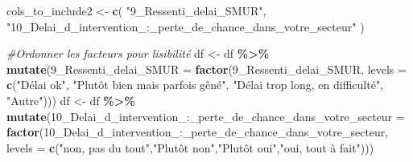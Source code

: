 \documentclass[
]{article}
\newenvironment{Shaded}{\begin{snugshade}}{\end{snugshade}}
\newcommand{\AttributeTok}[1]{\textcolor[rgb]{0.13,0.29,0.53}{#1}}
\newcommand{\CommentTok}[1]{\textcolor[rgb]{0.56,0.35,0.01}{\textit{#1}}}
\newcommand{\FunctionTok}[1]{\textcolor[rgb]{0.13,0.29,0.53}{\textbf{#1}}}
\newcommand{\NormalTok}[1]{#1}
\newcommand{\OtherTok}[1]{\textcolor[rgb]{0.56,0.35,0.01}{#1}}
\newcommand{\SpecialCharTok}[1]{\textcolor[rgb]{0.81,0.36,0.00}{\textbf{#1}}}
\newcommand{\StringTok}[1]{\textcolor[rgb]{0.31,0.60,0.02}{#1}}
\begin{document}
\begin{Shaded}
\begin{Highlighting}[]
\NormalTok{cols\_to\_include2 }\OtherTok{\textless{}{-}} \FunctionTok{c}\NormalTok{(}
  \StringTok{"9\_Ressenti\_delai\_SMUR"}\NormalTok{,}
  \StringTok{"10\_Delai\_d\_intervention\_:\_perte\_de\_chance\_dans\_votre\_secteur"}
\NormalTok{)}
    
\CommentTok{\#Ordonner les facteurs pour lisibilité}
\NormalTok{df }\OtherTok{\textless{}{-}}\NormalTok{ df }\SpecialCharTok{\%\textgreater{}\%}
  \FunctionTok{mutate}\NormalTok{(}\StringTok{\textasciigrave{}}\AttributeTok{9\_Ressenti\_delai\_SMUR}\StringTok{\textasciigrave{}} \OtherTok{=} \FunctionTok{factor}\NormalTok{(}\StringTok{\textasciigrave{}}\AttributeTok{9\_Ressenti\_delai\_SMUR}\StringTok{\textasciigrave{}}\NormalTok{,}
                                          \AttributeTok{levels =} \FunctionTok{c}\NormalTok{(}\StringTok{"Délai ok"}\NormalTok{,}
                                                     \StringTok{"Plutôt bien mais parfois gêné"}\NormalTok{,}
                                                     \StringTok{"Délai trop long, en difficulté"}\NormalTok{,}
                                                     \StringTok{"Autre"}\NormalTok{)))}
\NormalTok{df }\OtherTok{\textless{}{-}}\NormalTok{ df }\SpecialCharTok{\%\textgreater{}\%}
  \FunctionTok{mutate}\NormalTok{(}\StringTok{\textasciigrave{}}\AttributeTok{10\_Delai\_d\_intervention\_:\_perte\_de\_chance\_dans\_votre\_secteur}\StringTok{\textasciigrave{}} \OtherTok{=} \FunctionTok{factor}\NormalTok{(}\StringTok{\textasciigrave{}}\AttributeTok{10\_Delai\_d\_intervention\_:\_perte\_de\_chance\_dans\_votre\_secteur}\StringTok{\textasciigrave{}}\NormalTok{,}
                                                                                   \AttributeTok{levels =} \FunctionTok{c}\NormalTok{(}\StringTok{"non, pas du tout"}\NormalTok{,}\StringTok{"Plutôt non"}\NormalTok{,}\StringTok{"Plutôt oui"}\NormalTok{,}\StringTok{"oui, tout à fait"}\NormalTok{)))}


\end{Highlighting}
\end{Shaded}
\end{document}
